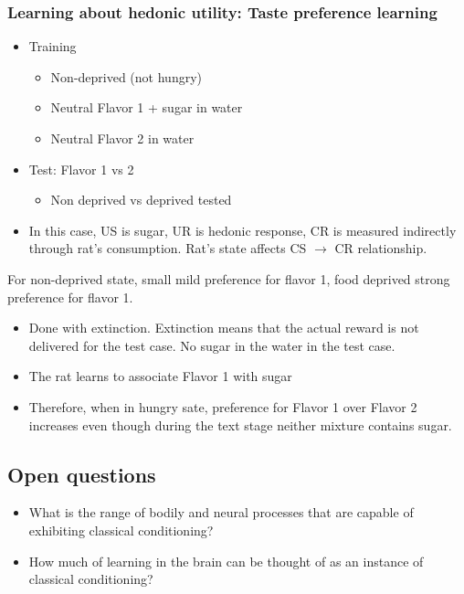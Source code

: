 \subsubsection{Learning about hedonic utility: Taste preference learning}
\begin{itemize}
    \item Training
    \begin{itemize}
        \item Non-deprived (not hungry)
        \item Neutral Flavor 1 + sugar in water
        \item Neutral Flavor 2 in water
    \end{itemize}
    \item Test: Flavor 1 vs 2
    \begin{itemize}
        \item Non deprived vs deprived tested
    \end{itemize}
    \item In this case, US is sugar, UR is hedonic response, CR is measured indirectly through rat's consumption. Rat's state affects CS $\rightarrow$ CR relationship.
\end{itemize}
For non-deprived state, small mild preference for flavor 1, food deprived strong preference for flavor 1.
\begin{itemize}
    \item Done with extinction. Extinction means that the actual reward is not delivered for the test case. No sugar in the water in the test case.
    \item The rat learns to associate Flavor 1 with sugar
    \item Therefore, when in hungry sate, preference for Flavor 1 over Flavor 2 increases even though during the text stage neither mixture contains sugar.
\end{itemize}

\subsection{Open questions}
\begin{itemize}
    \item What is the range of bodily and neural processes that are capable of exhibiting classical conditioning?
    \item How much of learning in the brain can be thought of as an instance of classical conditioning?
\end{itemize}

